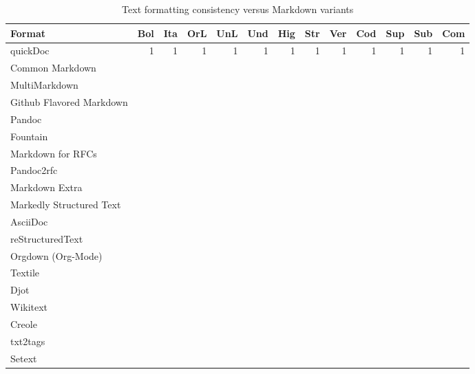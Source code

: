 \documentclass[a4paper,12pt]{article}
\begin{document}
\begin{table}[htbp]
\caption{\label{tab:org5bfcfec}Text formatting consistency versus Markdown variants}
\centering
\begin{tabular}{lrrrrrrrrrrrr}
\hline
Format & Bol & Ita & OrL & UnL & Und & Hig & Str & Ver & Cod & Sup & Sub & Com\\
\hline
quickDoc & 1 & 1 & 1 & 1 & 1 & 1 & 1 & 1 & 1 & 1 & 1 & 1\\
Common Markdown\autocite{johnmacfarlaneCommonMarkSpec2024} &  &  &  &  &  &  &  &  &  &  &  & \\
MultiMarkdown\autocite{fletchert.penneyMultiMarkdownUsersGuide2023} &  &  &  &  &  &  &  &  &  &  &  & \\
Github Flavored Markdown\autocite{GitHubFlavoredMarkdown2019} &  &  &  &  &  &  &  &  &  &  &  & \\
Pandoc\autocite{johnmacfarlanePandocUsersGuide2025} &  &  &  &  &  &  &  &  &  &  &  & \\
Fountain\autocite{SyntaxFountain} &  &  &  &  &  &  &  &  &  &  &  & \\
Markdown for RFCs\autocite{thomasleitnerKramdownSyntax} &  &  &  &  &  &  &  &  &  &  &  & \\
Pandoc2rfc &  &  &  &  &  &  &  &  &  &  &  & \\
Markdown Extra\autocite{PHPMarkdownExtra} &  &  &  &  &  &  &  &  &  &  &  & \\
Markedly Structured Text\autocite{JupyterbookMystmd2025} &  &  &  &  &  &  &  &  &  &  &  & \\
AsciiDoc &  &  &  &  &  &  &  &  &  &  &  & \\
reStructuredText &  &  &  &  &  &  &  &  &  &  &  & \\
Orgdown (Org-Mode) &  &  &  &  &  &  &  &  &  &  &  & \\
Textile &  &  &  &  &  &  &  &  &  &  &  & \\
Djot &  &  &  &  &  &  &  &  &  &  &  & \\
Wikitext &  &  &  &  &  &  &  &  &  &  &  & \\
Creole &  &  &  &  &  &  &  &  &  &  &  & \\
txt2tags &  &  &  &  &  &  &  &  &  &  &  & \\
Setext &  &  &  &  &  &  &  &  &  &  &  & \\
\hline
\end{tabular}
\end{table}
\end{document}
